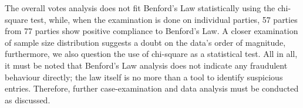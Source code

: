 \documentclass[12pt]{article}
\begin{document}
The overall votes analysis does not fit Benford's Law statistically using the chi-square test, while, when the examination is done on individual parties, 57 parties from 77 parties show positive compliance to Benford's Law. A closer examination of sample size distribution suggests a doubt on the data's order of magnitude, furthermore, we also question the use of chi-square as a statistical test. All in all, it must be noted that Benford's Law analysis does not indicate any fraudulent behaviour directly; the law itself is no more than a tool to identify suspicious entries. Therefore, further case-examination and data analysis must be conducted as discussed.

\medskip

\printbibliography
\end{document}
